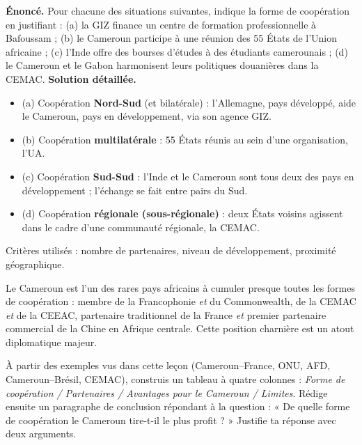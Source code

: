 \documentclass[11pt]{article}
\begin{document}
\begin{exoresolu}
\textbf{Énoncé.} Pour chacune des situations suivantes, indique la forme de coopération en justifiant : (a) la GIZ finance un centre de formation professionnelle à Bafoussam ; (b) le Cameroun participe à une réunion des 55 États de l'Union africaine ; (c) l'Inde offre des bourses d'études à des étudiants camerounais ; (d) le Cameroun et le Gabon harmonisent leurs politiques douanières dans la CEMAC.
\tcblower
\textbf{Solution détaillée.}
\begin{itemize}
\item (a) Coopération \textbf{Nord-Sud} (et bilatérale) : l'Allemagne, pays développé, aide le Cameroun, pays en développement, via son agence GIZ.
\item (b) Coopération \textbf{multilatérale} : 55 États réunis au sein d'une organisation, l'UA.
\item (c) Coopération \textbf{Sud-Sud} : l'Inde et le Cameroun sont tous deux des pays en développement ; l'échange se fait entre pairs du Sud.
\item (d) Coopération \textbf{régionale (sous-régionale)} : deux États voisins agissent dans le cadre d'une communauté régionale, la CEMAC.
\end{itemize}
Critères utilisés : nombre de partenaires, niveau de développement, proximité géographique.
\end{exoresolu}

\begin{savaistu}
Le Cameroun est l'un des rares pays africains à cumuler presque toutes les formes de coopération : membre de la Francophonie \emph{et} du Commonwealth, de la CEMAC \emph{et} de la CEEAC, partenaire traditionnel de la France \emph{et} premier partenaire commercial de la Chine en Afrique centrale. Cette position charnière est un atout diplomatique majeur.
\end{savaistu}

\begin{exercice}
À partir des exemples vus dans cette leçon (Cameroun--France, ONU, AFD, Cameroun--Brésil, CEMAC), construis un tableau à quatre colonnes : \emph{Forme de coopération / Partenaires / Avantages pour le Cameroun / Limites}. Rédige ensuite un paragraphe de conclusion répondant à la question : « De quelle forme de coopération le Cameroun tire-t-il le plus profit ? » Justifie ta réponse avec deux arguments.
\end{exercice}
\end{document}
